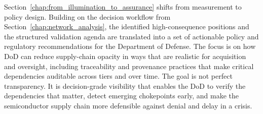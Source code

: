 Section~\ref{chap:from_illumination_to_assurance} shifts from measurement to policy design. Building on the decision workflow from Section~\ref{chap:network_analysis}, the identified high-consequence positions and the structured validation agenda are translated into a set of actionable policy and regulatory recommendations for the Department of Defense. The focus is on how DoD can reduce supply-chain opacity in ways that are realistic for acquisition and oversight, including traceability and provenance practices that make critical dependencies auditable across tiers and over time. The goal is not perfect transparency. It is decision-grade visibility that enables the DoD to verify the dependencies that matter, detect emerging chokepoints early, and make the semiconductor supply chain more defensible against denial and delay in a crisis.